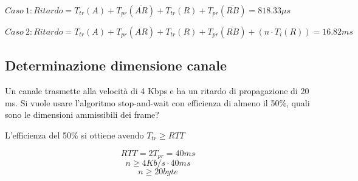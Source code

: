         $Caso ~ 1: Ritardo = T_{tr}(A) + T_{pr}(\overline{AR}) + T_{tr}(R) + T_{pr}(\overline{RB}) = 818.33 \mu s$

        $Caso ~ 2: Ritardo = T_{tr}(A) + T_{pr}(\overline{AR}) + T_{tr}(R) + T_{pr}(\overline{RB}) + (n \cdot T_i(R)) = 16.82 ms$


    \subsection{Determinazione dimensione canale}
        \problem
        Un canale trasmette alla velocità di 4 Kbps e ha un ritardo di propagazione di 20 ms. Si vuole usare l'algoritmo stop-and-wait con efficienza di almeno il 50\%, quali sono le dimensioni ammissibili dei frame?

        \solution
        L'efficienza del 50\% si ottiene avendo $T_{tr} \geq RTT$

        \begin{equation*}
            RTT = 2 T_{pr} = 40ms
        \end{equation*}
        \begin{equation*}
            n \geq 4 Kb/s \cdot 40 ms
        \end{equation*}
        \begin{equation*}
            n \geq 20 byte
        \end{equation*}
